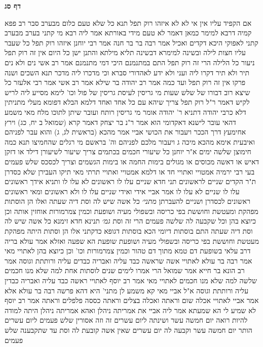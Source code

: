 \documentclass[12pt, openany]{book}
\newcommand{\sethebfont}{
\fontsize{10.5pt}{21.0pt} \selectfont
}
\newcommand{\twocol}[1]{
	{\sethebfont \begin{multicols}{2}
			#1
	\end{multicols}}	
}
\newcommand{\sectname}{}
\newcommand{\newsection}[1]{
	\addcontentsline{toc}{section}{#1}
	\renewcommand{\sectname}{#1}	
	\vspace{-\baselineskip}
	\begin{center}
		\textbf{%
\fontsize{16pt}{16pt}\selectfont
			#1}
	\end{center}
	\vspace{-\baselineskip}
	\nopagebreak
}
\begin{document}
\newsection{דף סג}
\twocol{אם הקפיד עליו אין אי לא לא
איזהו רוק תפל תנא כל שלא טעם כלום מבערב סבר רב פפא קמיה דרבא למימר כמאן דאמר לא טעם מידי באורתא אמר ליה רבא מי קתני בערב מבערב קתני לאפוקי היכא דקדים ואכיל 
אמר רבה בר בר חנה אמר רבי יוחנן איזהו רוק תפל כל שעבר עליו חצות לילה ובשינה למימרא דבשינה תליא מילתא והתנן ישן כל היום אין זה רוק תפל ניעור כל הלילה הרי זה רוק תפל התם במתנמנם 
היכי דמי מתנמנם אמר רב אשי נים ולא נים תיר ולא תיר דקרו ליה ועני ולא ידע לאהדורי סברא וכי מדכרו ליה מדכר 
תנא השכים ושנה פרקו אין זה רוק תפל ועד כמה אמר רב יהודה בר שילא אמר רב אשי אמר רבי אלעזר כל שיצא רוב דבורו של שלש שעות
מי גריסין לעיסת גריסין של פול וכו' לימא מסייע ליה לריש לקיש דאמר ר"ל רוק תפל צריך שיהא עם כל אחד ואחד דלמא הבלא דפומא מעלי 
מתניתין דלא כרבי יהודה דתניא ר' יהודה אומר מי גריסין רותח ועובר שיתן לתוכו מלח 
מאי משמע דהאי עובר לישנא דאקדומי הוא אמר ר"נ בר יצחק דאמר קרא (שמואל ב יח, כג) וירץ אחימעץ דרך הככר ויעבור את הכושי אביי אמר מהכא (בראשית לג, ג) והוא עבר לפניהם ואיבעית אימא מהכא {מיכה ג } ויעבור מלכם לפניהם וה' בראשם
מי רגלים שהחמיצו תנא כמה חימוצן שלשה ימים 
א"ר יוחנן כל שיעורי חכמים בכתמים צריך שיעור לשיעורן דילד או דזקן דאיש או דאשה מכוסים או מגולים בימות החמה או בימות הגשמים
וצריך לכסכס שלש פעמים בעי רבי ירמיה אמטויי ואתויי חד או דלמא אמטויי ואתויי תרתי מאי תיקו
העבירן שלא כסדרן ת"ר הקדים שניים לראשונים תני חדא שניים עלו לו ראשונים לא עלו לו ותניא אידך ראשונים עלו לו שניים לא עלו לו 
אמר אביי אידי ואידי שניים עלו לו ולא ראשונים ומאי ראשונים ראשונים לכסדרן ושניים להעברתן
{\large\emph{מתני׳}} כל אשה שיש לה וסת דיה שעתה ואלו הן הוסתות מפהקת ומעטשת וחוששת בפי כריסה ובשפולי מעיה ושופעת וכמין צמרמורות אוחזין אותה וכן כיוצא בהן וכל שקבעה לה שלשה פעמים הרי זה וסת
{\large\emph{גמ׳}} תנינא חדא זימנא כל אשה שיש לה וסת דיה שעתה התם בוסתות דיומי הכא בוסתות דגופא 
כדקתני אלו הן וסתות היתה מפהקת מעטשת וחוששת בפי כריסה ובשפולי מעיה ושופעת 
שופעת הא שפעה ואזלא אמר עולא בריה דרב עלאי
בשופעת דם טמא מתוך דם טהור 
וכמין צמרמורות וכו' וכן כיוצא בהן לאתויי מאי אמר רבה בר עולא לאתויי אשה שראשה כבד עליה ואבריה כבדים עליה ורותתת וגוסה 
אמר רב הונא בר חייא אמר שמואל הרי אמרו לימים שנים לוסתות אחת למה שלא מנו חכמים שלשה 
למה שלא מנו חכמים לאתויי מאי אמר רב יוסף לאתויי ראשה כבד עליה ואבריה כבדין עליה ורותתת וגוסה א"ל אביי מאי קא משמע לן מתני' היא דהא פרשה רבה בר עולא אלא אמר אביי לאתויי אכלה שום וראתה ואכלה בצלים וראתה כססה פלפלים וראתה 
אמר רב יוסף לא שמיע לי הא שמעתא 
אמר ליה אביי את אמריתה ניהלן ואהא אמריתה ניהלן היתה למודה להיות רואה יום חמשה עשר ושינתה ליום עשרים זה וזה אסורין שלש פעמים ליום עשרים הותר יום חמשה עשר וקבעה לה יום עשרים שאין אשה קובעת לה וסת עד שתקבענה שלש פעמים 
}
\end{document}
